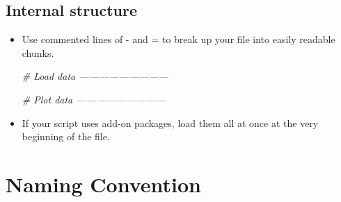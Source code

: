 \documentclass[
]{book}
\newenvironment{Shaded}{\begin{snugshade}}{\end{snugshade}}
\newcommand{\CommentTok}[1]{\textcolor[rgb]{0.56,0.35,0.01}{\textit{#1}}}
\begin{document}
\hypertarget{internal-structure}{%
\subsection{Internal structure}\label{internal-structure}}

\begin{itemize}
\item
  Use commented lines of - and = to break up your file into easily readable chunks.

\begin{Shaded}
\begin{Highlighting}[]
\CommentTok{# Load data ---------------------------}

\CommentTok{# Plot data ---------------------------}
\end{Highlighting}
\end{Shaded}
\item
  If your script uses add-on packages, load them all at once at the very
  beginning of the file.
\end{itemize}

\hypertarget{naming-convention}{%
\section{Naming Convention}\label{naming-convention}}
\end{document}
